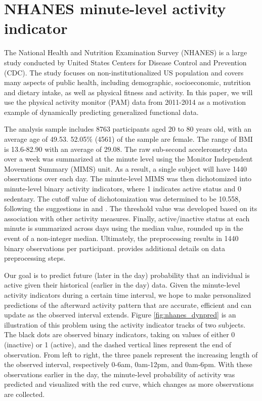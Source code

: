 \documentclass[12pt]{article}
\begin{document}
\section{NHANES minute-level activity indicator}
\label{sec:data}

The National Health and Nutrition Examination Survey (NHANES) is a large study conducted by United States Centers for Disease Control and Prevention (CDC). The study focuses on non-institutionalized US population and covers many aspects of public health, including demographic,
socioeconomic, nutrition and
dietary intake, as well as physical fitness and activity. In this paper, we will use the physical activity monitor (PAM) data from 2011-2014 as a motivation example of dynamically predicting generalized functional data. 

The analysis sample includes 8763 participants aged 20 to 80 years old, with an average age of 49.53. 52.05\% (4561)  of the sample are female. The range of BMI is 13.6-82.90 with an average of 29.08. The raw sub-second accelerometry data over a week was summarized at the minute level using the Monitor Independent Movement Summary (MIMS) unit. As a result, a single subject will have 1440 observations over each day. The minute-level MIMS was then dichotomized into minute-level binary activity indicators, where 1 indicates active status and 0 sedentary. The cutoff value of dichotomization was determined to be 10.558, following the suggestions in \citet{preprocess} and \citet{Koster2016}. The threshold value was developed based on its association with other activity measures. Finally, active/inactive status at each minute is summarized across days using the median value, rounded up in the event of a non-integer median. Ultimately, the preprocessing results in 1440 binary observations per participant.  \citet{leroux2022} provides additional details on data preprocessing steps. 

Our goal is to predict future (later in the day) probability that an individual is active given their historical (earlier in the day) data. Given the minute-level activity indicators during a certain time interval, we hope to make personalized predictions of the afterward activity pattern that are accurate, efficient and can update as the observed interval extends. Figure \ref{fig:nhanes_dynpred} is an illustration of this problem using the activity indicator tracks of two subjects. The black dots are observed binary indicators, taking on values of either 0 (inactive) or 1 (active), and the dashed vertical lines represent the end of observation. From left to right, the three panels represent the increasing length of the observed interval, respectively 0-6am, 0am-12pm, and 0am-6pm. With these observations earlier in the day, the minute-level probability of activity was predicted and visualized with the red curve, which changes as more observations are collected.  
\end{document}
